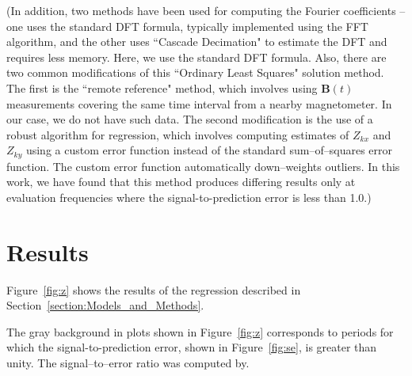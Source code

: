 \documentclass[draft,linenumbers]{agujournal2018}
\begin{document}
(In addition, two methods have been used for computing the Fourier coefficients -- one uses the standard DFT formula, typically implemented using the FFT algorithm, and the other uses ``Cascade Decimation" \citep{Wight1980} to estimate the DFT and requires less memory. Here, we use the standard DFT formula. Also, there are two common modifications of this ``Ordinary Least Squares" solution method. The first is the ``remote reference"  method, which involves using $\mathbf{B}(t)$ measurements covering the same time interval from a nearby magnetometer. In our case, we do not have such data. The second modification is the use of a robust algorithm for regression, which involves computing estimates of $Z_{kx}$ and $Z_{ky}$ using a custom error function instead of the standard sum--of--squares error function. The custom error function automatically down--weights outliers. In this work, we have found that this method produces differing results only at evaluation frequencies where the signal-to-prediction error is less than 1.0.)
\section{Results}
\label{section:Results}

Figure~\ref{fig:z} shows the results of the regression described in Section~\ref{section:Models_and_Methods}.

The gray background in plots shown in Figure~\ref{fig:z} corresponds to periods for which the signal-to-prediction error, shown in Figure~\ref{fig:se}, is greater than unity. The signal--to--error ratio was computed by\todo{}.
\end{document}
